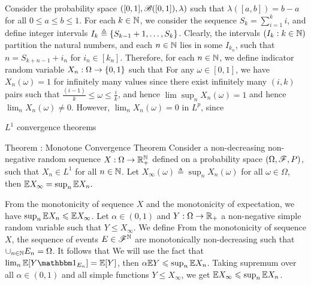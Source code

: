 \documentclass[12pt,aspectratio=169]{beamer}
\begin{document}
\begin{frame}
\begin{Example} 
Consider the probability space $([0,1], \mathscr{B}([0,1]), \lambda)$ such that $\lambda([a,b]) = b-a$ for all $0 \le a \le b \le 1$. 
For each $k \in \mathbb{N}$, we consider the sequence $S_k = \sum_{i=1}^ki$, and define integer intervals $I_k \triangleq \left\{S_{k-1}+1, \dots, S_{k}\right\}$. 
Clearly, the intervals $(I_k:k \in \mathbb{N})$ partition the natural numbers, 
and each $n \in \mathbb{N}$ lies in some $I_{k_n}$, such that $n = S_{k+n-1}+i_n$ for $i_n \in [k_n]$. 
Therefore, for each $n \in \mathbb{N}$, we define indicator random variable $X_n: \Omega \to \left\{0,1\right\}$ such that 
For any $\omega \in [0,1]$, we have $X_n(\omega) = 1$ for infinitely many values since there exist infinitely many $(i,k)$ pairs such that $\frac{(i-1)}{k} \le \omega \le \frac{i}{k}$, 
and hence $\lim\sup_nX_n(\omega) = 1$ and hence $\lim_nX_n(\omega) \neq 0$. 
However, $\lim_nX_n(\omega) = 0$ in $L^p$, since 
\end{Example}
\end{frame}

\begin{frame}{$L^1$ convergence theorems}
\begin{block}{Theorem : Monotone Convergence Theorem}
Consider a non-decreasing non-negative random sequence $X: \Omega\to\mathbb{R}_+^{\mathbb{N}}$ defined on a probability space $(\Omega,\mathscr{F},P)$, 
such that $X_n \in L^1$ for all $n \in \mathbb{N}$. 
Let $X_\infty(\omega) \triangleq \sup_nX_n(\omega)$ for all $\omega \in \Omega$, then  
$
\mathbb{E} X_\infty = \sup_n\mathbb{E} X_n.
$
\end{block}
\end{frame}

\begin{frame}
\begin{Proof}
From the monotonicity of sequence $X$ and the monotonicity of expectation, we have $\sup_n\mathbb{E} X_n \leqslant \mathbb{E} X_\infty$. 
Let $\alpha \in (0,1)$ and $Y: \Omega\to\mathbb{R}_+$ a non-negative simple random variable such that $Y \le X_\infty$. 
We define 
From the monotonicity of sequence $X$, 
the sequence of events $E \in \mathscr{F}^{\mathbb{N}}$ are monotonically non-decreasing such that $\cup_{n \in \mathbb{N}}E_n = \Omega$. 
It follows that 
We will use the fact that $\lim_n\E[Y\Ind{E_n}] = \E[Y]$, then $\alpha\mathbb{E} Y \leqslant \sup_n\mathbb{E} X_n$. 
Taking supremum over all $\alpha \in (0,1)$ and all simple functions $Y \le X_\infty$, we get $\mathbb{E} X_\infty \leqslant \sup_n\mathbb{E} X_n$. 
\end{Proof}
\end{frame}
\end{document}
